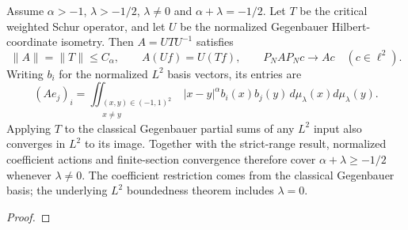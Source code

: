 \begin{supporting}


\begin{theorem}
\label{thm:power-law-critical-coefficients}
\leanok
Assume $\alpha>-1$, $\lambda>-1/2$, $\lambda\ne0$ and
$\alpha+\lambda=-1/2$. Let $T$ be the critical weighted Schur operator,
and let $U$ be the normalized Gegenbauer Hilbert-coordinate isometry.
Then $A=UTU^{-1}$ satisfies
\[
 \|A\|=\|T\|\le C_\alpha,\qquad A(Uf)=U(Tf),\qquad
 P_NAP_Nc\longrightarrow Ac\quad(c\in\ell^2).
\]
Writing $b_i$ for the normalized $L^2$ basis vectors, its entries are
\[
 (Ae_j)_i=\iint_{\substack{(x,y)\in(-1,1)^2\\x\ne y}} |x-y|^\alpha b_i(x)b_j(y)\,
 d\mu_\lambda(x)d\mu_\lambda(y).
\]
Applying $T$ to the classical Gegenbauer partial sums of any $L^2$ input
also converges in $L^2$ to its image. Together with the strict-range result,
normalized coefficient actions and finite-section convergence therefore cover
$\alpha+\lambda\ge-1/2$ whenever $\lambda\ne0$.
The coefficient restriction comes from the classical Gegenbauer basis;
the underlying $L^2$ boundedness theorem includes $\lambda=0$.
\end{theorem}
\begin{proof}
\leanok
\end{proof}


\end{supporting}
